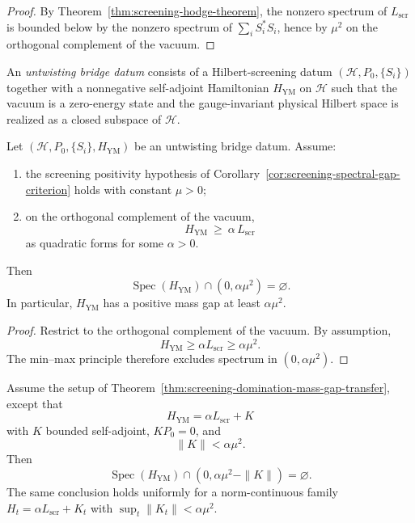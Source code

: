 \begin{proof}
By Theorem~\ref{thm:screening-hodge-theorem}, the nonzero spectrum of $L_{\mathrm{scr}}$ is bounded below by the
nonzero spectrum of $\sum_i S_i^*S_i$, hence by $\mu^2$ on the orthogonal complement of the vacuum.
\end{proof}

\begin{definition}
\label{def:untwisting-bridge-datum}
An \emph{untwisting bridge datum} consists of a Hilbert-screening datum $(\mathcal H,P_0,\{S_i\})$
together with a nonnegative self-adjoint Hamiltonian $H_{\mathrm{YM}}$ on $\mathcal H$ such that the vacuum
is a zero-energy state and the gauge-invariant physical Hilbert space is realized as a closed subspace of $\mathcal H$.
\end{definition}

\begin{theorem}
\label{thm:screening-domination-mass-gap-transfer}
Let $(\mathcal H,P_0,\{S_i\},H_{\mathrm{YM}})$ be an untwisting bridge datum.
Assume:
\begin{enumerate}[label=(\alph*)]
\item the screening positivity hypothesis of Corollary~\ref{cor:screening-spectral-gap-criterion} holds with constant $\mu>0$;
\item on the orthogonal complement of the vacuum,
\[
H_{\mathrm{YM}}\ \ge\ \alpha\, L_{\mathrm{scr}}
\]
as quadratic forms for some $\alpha>0$.
\end{enumerate}
Then
\[
\operatorname{Spec}(H_{\mathrm{YM}})\cap (0,\alpha\mu^2)=\varnothing.
\]
In particular, $H_{\mathrm{YM}}$ has a positive mass gap at least $\alpha\mu^2$.
\end{theorem}

\begin{proof}
Restrict to the orthogonal complement of the vacuum. By assumption,
\[
H_{\mathrm{YM}}\ge \alpha L_{\mathrm{scr}} \ge \alpha\mu^2.
\]
The min--max principle therefore excludes spectrum in $(0,\alpha\mu^2)$.
\end{proof}

\begin{corollary}
\label{cor:stable-untwisting-bounded-error}
Assume the setup of Theorem~\ref{thm:screening-domination-mass-gap-transfer}, except that
\[
H_{\mathrm{YM}} = \alpha L_{\mathrm{scr}} + K
\]
with $K$ bounded self-adjoint, $KP_0=0$, and
\[
\|K\|<\alpha\mu^2.
\]
Then
\[
\operatorname{Spec}(H_{\mathrm{YM}})\cap (0,\alpha\mu^2-\|K\|)=\varnothing.
\]
The same conclusion holds uniformly for a norm-continuous family $H_t=\alpha L_{\mathrm{scr}}+K_t$ with
$\sup_t\|K_t\|<\alpha\mu^2$.
\end{corollary}

